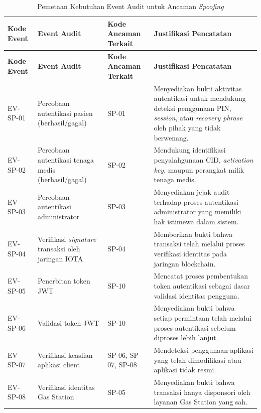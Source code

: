 \begin{xltabular}{\textwidth}{|>{\centering\arraybackslash}p{1.4cm}|X|>{\centering\arraybackslash}p{1.9cm}|X|}
\caption{Pemetaan Kebutuhan Event Audit untuk Ancaman \textit{Spoofing}}
\label{tab:event-spoofing}\\
\hline
\textbf{Kode Event} &
\textbf{Event Audit} &
\textbf{Kode Ancaman Terkait} &
\textbf{Justifikasi Pencatatan}\\
\hline
\endfirsthead

\hline
\textbf{Kode Event} &
\textbf{Event Audit} &
\textbf{Kode Ancaman Terkait} &
\textbf{Justifikasi Pencatatan}\\
\hline
\endhead

EV-SP-01 &
Percobaan autentikasi pasien (berhasil/gagal) &
SP-01 &
Menyediakan bukti aktivitas autentikasi untuk mendukung deteksi penggunaan PIN, \textit{session}, atau \textit{recovery phrase} oleh pihak yang tidak berwenang.\\
\hline

EV-SP-02 &
Percobaan autentikasi tenaga medis (berhasil/gagal) &
SP-02 &
Mendukung identifikasi penyalahgunaan CID, \textit{activation key}, maupun perangkat milik tenaga medis.\\
\hline

EV-SP-03 &
Percobaan autentikasi administrator &
SP-03 &
Menyediakan jejak audit terhadap proses autentikasi administrator yang memiliki hak istimewa dalam sistem.\\
\hline

EV-SP-04 &
Verifikasi \textit{signature} transaksi oleh jaringan IOTA &
SP-04 &
Memberikan bukti bahwa transaksi telah melalui proses verifikasi identitas pada jaringan blockchain.\\
\hline

EV-SP-05 &
Penerbitan token JWT &
SP-10 &
Mencatat proses pembentukan token autentikasi sebagai dasar validasi identitas pengguna.\\
\hline

EV-SP-06 &
Validasi token JWT &
SP-10 &
Menyediakan bukti bahwa setiap permintaan telah melalui proses autentikasi sebelum diproses lebih lanjut.\\
\hline

EV-SP-07 &
Verifikasi keaslian aplikasi client &
SP-06, SP-07, SP-08 &
Mendeteksi penggunaan aplikasi yang telah dimodifikasi atau aplikasi tidak resmi.\\
\hline

EV-SP-08 &
Verifikasi identitas Gas Station &
SP-05 &
Menyediakan bukti bahwa transaksi hanya disponsori oleh layanan Gas Station yang sah.\\
\hline

\end{xltabular}

